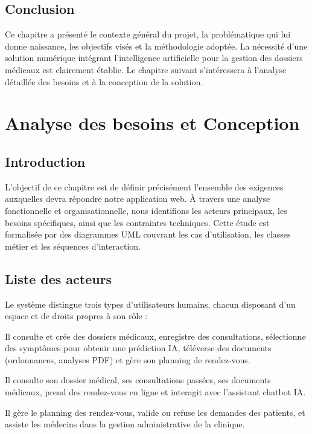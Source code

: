 \documentclass[12pt,a4paper]{report}
\begin{document}
\section*{Conclusion}

Ce chapitre a présenté le contexte général du projet, la problématique qui lui donne
naissance, les objectifs visés et la méthodologie adoptée. La nécessité d'une solution
numérique intégrant l'intelligence artificielle pour la gestion des dossiers médicaux est
clairement établie. Le chapitre suivant s'intéressera à l'analyse détaillée des besoins et
à la conception de la solution.

\chapter{Analyse des besoins et Conception}

\section*{Introduction}

L'objectif de ce chapitre est de définir précisément l'ensemble des exigences auxquelles
devra répondre notre application web. À travers une analyse fonctionnelle et
organisationnelle, nous identifions les acteurs principaux, les besoins spécifiques, ainsi
que les contraintes techniques. Cette étude est formalisée par des diagrammes UML couvrant
les cas d'utilisation, les classes métier et les séquences d'interaction.

\section{Liste des acteurs}

Le système distingue trois types d'utilisateurs humains, chacun disposant d'un espace
et de droits propres à son rôle :

\begin{description}[leftmargin=2cm, style=nextline]
    \item[\textbf{Médecin}]
    Il consulte et crée des dossiers médicaux, enregistre des consultations, sélectionne
    des symptômes pour obtenir une prédiction IA, téléverse des documents (ordonnances,
    analyses PDF) et gère son planning de rendez-vous.

    \item[\textbf{Patient}]
    Il consulte son dossier médical, ses consultations passées, ses documents médicaux,
    prend des rendez-vous en ligne et interagit avec l'assistant chatbot IA.

    \item[\textbf{Secrétaire}]
    Il gère le planning des rendez-vous, valide ou refuse les demandes des patients, et
    assiste les médecins dans la gestion administrative de la clinique.
\end{description}
\end{document}
